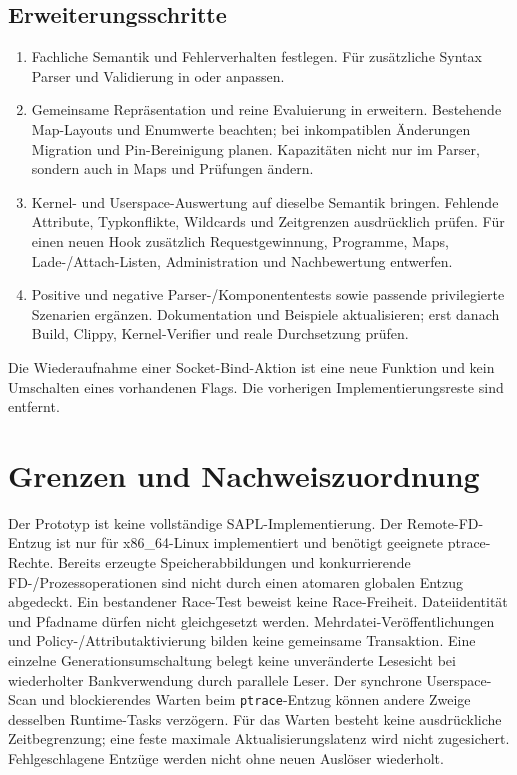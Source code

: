 \documentclass[12pt,a4paper]{article}
\begin{document}
\subsection{Erweiterungsschritte}
\begin{enumerate}
  \item Fachliche Semantik und Fehlerverhalten festlegen. Für zusätzliche Syntax
    Parser und Validierung in 
    oder  anpassen.
  \item Gemeinsame Repräsentation und reine Evaluierung in
     erweitern. Bestehende Map-Layouts und
    Enumwerte beachten; bei inkompatiblen Änderungen Migration und Pin-Bereinigung
    planen. Kapazitäten nicht nur im Parser, sondern auch in Maps und Prüfungen ändern.
  \item Kernel- und Userspace-Auswertung auf dieselbe Semantik bringen.
    Fehlende Attribute, Typkonflikte, Wildcards und Zeitgrenzen ausdrücklich prüfen.
    Für einen neuen Hook zusätzlich Requestgewinnung, Programme, Maps,
    Lade-/Attach-Listen, Administration und Nachbewertung entwerfen.
  \item Positive und negative Parser-/Komponententests sowie passende
    privilegierte Szenarien ergänzen. Dokumentation und Beispiele aktualisieren;
    erst danach Build, Clippy, Kernel-Verifier und reale Durchsetzung prüfen.
\end{enumerate}
Die Wiederaufnahme einer Socket-Bind-Aktion ist eine neue Funktion und kein
Umschalten eines vorhandenen Flags. Die vorherigen Implementierungsreste sind entfernt.

\section{Grenzen und Nachweiszuordnung}
Der Prototyp ist keine vollständige SAPL-Implementierung. Der Remote-FD-Entzug
ist nur für x86\_64-Linux implementiert und benötigt geeignete ptrace-Rechte.
Bereits erzeugte Speicherabbildungen und konkurrierende FD-/Prozessoperationen
sind nicht durch einen atomaren globalen Entzug abgedeckt. Ein bestandener
Race-Test beweist keine Race-Freiheit. Dateiidentität und Pfadname dürfen nicht
gleichgesetzt werden. Mehrdatei-Veröffentlichungen und Policy-/Attributaktivierung
bilden keine gemeinsame Transaktion. Eine einzelne Generationsumschaltung belegt
keine unveränderte Lesesicht bei wiederholter Bankverwendung durch parallele Leser.
Der synchrone Userspace-Scan und blockierendes Warten beim \texttt{ptrace}-Entzug
können andere Zweige desselben Runtime-Tasks verzögern. Für das Warten besteht
keine ausdrückliche Zeitbegrenzung; eine feste maximale Aktualisierungslatenz wird
nicht zugesichert. Fehlgeschlagene Entzüge werden nicht ohne neuen Auslöser wiederholt.
\end{document}
